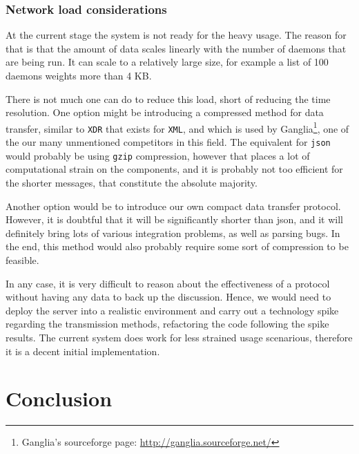 \documentclass{l3proj}
\begin{document}
\subsection{Network load considerations}

At the current stage the system is not ready for the heavy usage. The reason for that is that the amount of data scales linearly with the number of daemons that are being run. It can scale to a relatively large size, for example a list of 100 daemons weights more than 4 KB. 

There is not much one can do to reduce this load, short of reducing the time resolution. One option might be introducing a compressed method for data transfer, similar to \texttt{XDR} that exists for \texttt{XML}, and which is used by Ganglia\footnote{\raggedright{}Ganglia's sourceforge page: \url{http://ganglia.sourceforge.net/}}, one of the our many unmentioned competitors in this field. The equivalent for \texttt{json} would probably be using \texttt{gzip} compression, however that places a lot of computational strain on the components, and it is probably not too efficient for the shorter messages, that constitute the absolute majority.

Another option would be to introduce our own compact data transfer protocol. However, it is doubtful that it will be significantly shorter than json, and it will definitely bring lots of various integration problems, as well as parsing bugs. In the end, this method would also probably require some sort of compression to be feasible.

In any case, it is very difficult to reason about the effectiveness of a protocol without having any data to back up the discussion. Hence, we would need to deploy the server into a realistic environment and carry out a technology spike regarding the transmission methods, refactoring the code following the spike results. The current system does work for less strained usage scenarious, therefore it is a decent initial implementation.



\chapter{Conclusion}
\end{document}
